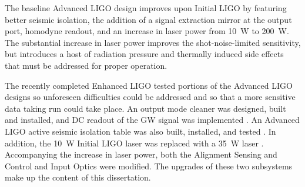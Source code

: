 The baseline Advanced LIGO design \cite{AdvLigoSysDesign} improves
upon Initial LIGO by featuring better seismic isolation, the addition
of a signal extraction mirror at the output port, homodyne readout,
and an increase in laser power from 10~W to 200~W. The substantial
increase in laser power improves the shot-noise-limited sensitivity,
but introduces a host of radiation pressure and thermally induced side
effects that must be addressed for proper operation.

The recently completed Enhanced LIGO tested portions of the Advanced
LIGO designs so unforeseen difficulties could be addressed and so that
a more sensitive data taking run could take place. An output mode
cleaner was designed, built and installed, and DC readout of the GW
signal was implemented \cite{Fricke2011DC}. An Advanced LIGO active
seismic isolation table was also built, installed, and tested
\cite{KisselThesis}. In addition, the 10~W Initial LIGO laser was
replaced with a 35~W laser \cite{Frede2007Fundamental}. Accompanying
the increase in laser power, both the Alignment Sensing and Control
and Input Optics were modified. The upgrades of these two subsystems
make up the content of this dissertation. 


